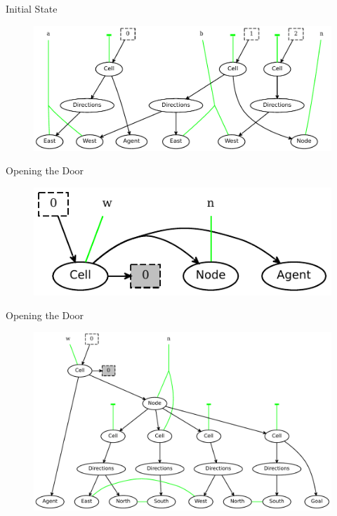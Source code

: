 \documentclass{beamer}
\begin{document}
\begin{frame}{Initial State}
  \begin{figure}
    \centering
    \includegraphics[width=\textwidth]{../models/agent2/initial.pdf}
  \end{figure}
\end{frame}

\begin{frame}{Opening the Door}
  \begin{figure}
    \centering
    \includegraphics{../models/agent2/closedDoor_lhs.pdf}
  \end{figure}
\end{frame}

\begin{frame}{Opening the Door}
  \begin{figure}
    \centering
    \includegraphics[width=\textwidth]{../models/agent2/closedDoor_rhs.pdf}
  \end{figure}
\end{frame}
\end{document}

